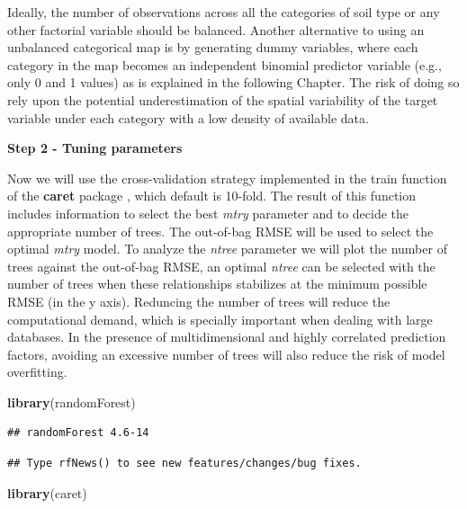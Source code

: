 \documentclass[10pt,b5paper,]{book}
\newenvironment{Shaded}{\begin{snugshade}}{\end{snugshade}}
\newcommand{\KeywordTok}[1]{\textcolor[rgb]{0.13,0.29,0.53}{\textbf{#1}}}
\newcommand{\NormalTok}[1]{#1}
\theoremstyle{definition}
\theoremstyle{definition}
\theoremstyle{definition}
\theoremstyle{remark}
\begin{document}
Ideally, the number of observations across all the categories of soil
type or any other factorial variable should be balanced. Another
alternative to using an unbalanced categorical map is by generating
dummy variables, where each category in the map becomes an independent
binomial predictor variable (e.g., only 0 and 1 values) as is explained
in the following Chapter. The risk of doing so rely upon the potential
underestimation of the spatial variability of the target variable under
each category with a low density of available data.

\textbf{Step 2 - Tuning parameters}

Now we will use the cross-validation strategy implemented in the train
function of the \textbf{caret} package \citep{kuhn2017caret}, which
default is 10-fold. The result of this function includes information to
select the best \emph{mtry} parameter and to decide the appropriate
number of trees. The out-of-bag RMSE will be used to select the optimal
\emph{mtry} model. To analyze the \emph{ntree} parameter we will plot
the number of trees against the out-of-bag RMSE, an optimal \emph{ntree}
can be selected with the number of trees when these relationships
stabilizes at the minimum possible RMSE (in the y axis). Reduncing the
number of trees will reduce the computational demand, which is specially
important when dealing with large databases. In the presence of
multidimensional and highly correlated prediction factors, avoiding an
excessive number of trees will also reduce the risk of model
overfitting.

\begin{Shaded}
\begin{Highlighting}[]
\KeywordTok{library}\NormalTok{(randomForest)}
\end{Highlighting}
\end{Shaded}

\begin{verbatim}
## randomForest 4.6-14
\end{verbatim}

\begin{verbatim}
## Type rfNews() to see new features/changes/bug fixes.
\end{verbatim}

\begin{Shaded}
\begin{Highlighting}[]
\KeywordTok{library}\NormalTok{(caret)}
\end{Highlighting}
\end{Shaded}
\end{document}
